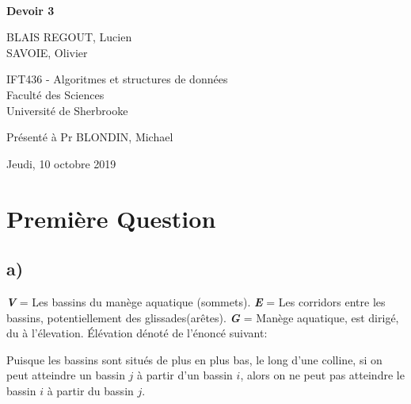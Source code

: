 \documentclass[11pt,a4paper, oneside, oldfontcommands]{memoir}
\begin{document}
\thispagestyle{empty}

{%
\sffamily
\centering
\Large

~\vspace{\fill}

{\huge 
\textbf{Devoir 3}
}

\vspace{2.5cm}

{
BLAIS REGOUT, Lucien\\
SAVOIE, Olivier
}

\vspace{3.5cm}

IFT436 - Algoritmes et structures de données\\[1em]

Faculté des Sciences\\
Université de Sherbrooke

\vspace{3.5cm}

Présenté à Pr BLONDIN, Michael

\vspace{\fill}

Jeudi, 10 octobre 2019

}%
\chapter{Première Question}
\section{a)}
  \textbf{\textit{V}} = Les bassins du manège aquatique (sommets).
  \textbf{\textit{E}} = Les corridors entre les bassins, potentiellement des glissades(arêtes).
  \textbf{\textit{G}} = Manège aquatique, est dirigé, du à l'élevation.
  Élévation dénoté de l'énoncé suivant:
  \begin{siderules}
    Puisque les bassins sont situés de plus en plus bas, le long d'une colline, si on peut atteindre un bassin $j$ à partir d'un bassin $i$, alors on ne peut pas atteindre le bassin $i$ à partir du bassin $j$.
  \end{siderules}
\end{document}
